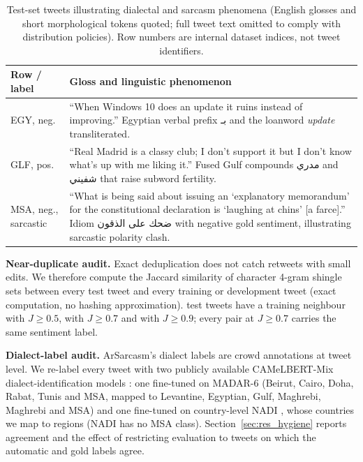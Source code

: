 \documentclass[11pt]{article}
\newcommand{\textarabic}[1]{{\beginR\arabicfont #1\endR}}
\begin{document}
\begin{table}[tbp]
\caption{Test-set tweets illustrating dialectal and sarcasm phenomena (English glosses and short morphological tokens quoted; full tweet text omitted to comply with distribution policies). Row numbers are internal dataset indices, not tweet identifiers.}
\label{tab:examples}
\centering
\footnotesize
\setlength{\tabcolsep}{4pt}
\begin{tabularx}{\linewidth}{>{\raggedright\arraybackslash}p{2.6cm}>{\raggedright\arraybackslash}X}
\toprule
\textbf{Row / label} & \textbf{Gloss and linguistic phenomenon} \\
\midrule
4199 EGY, neg. & ``When Windows 10 does an update it ruins instead of improving.'' Egyptian verbal prefix \textarabic{بـ} and the loanword \emph{update} transliterated. \\
\addlinespace
4205 GLF, pos. & ``Real Madrid is a classy club; I don't support it but I don't know what's up with me liking it.'' Fused Gulf compounds \textarabic{مدري} and \textarabic{شفيني} that raise subword fertility. \\
\addlinespace
4196 MSA, neg., sarcastic & ``What is being said about issuing an `explanatory memorandum' for the constitutional declaration is `laughing at chins' [a farce].'' Idiom \textarabic{ضحك على الذقون} with negative gold sentiment, illustrating sarcastic polarity clash. \\
\bottomrule
\end{tabularx}
\end{table}

\textbf{Near-duplicate audit.} Exact deduplication does not catch retweets with small edits. We therefore compute the Jaccard similarity of character 4-gram shingle sets \cite{broder1997minhash} between every test tweet and every training or development tweet (exact computation, no hashing approximation). \ndFive{} test tweets have a training neighbour with $J\ge0.5$, \ndSeven{} with $J\ge0.7$ and \ndNine{} with $J\ge0.9$; every pair at $J\ge0.7$ carries the same sentiment label.

\textbf{Dialect-label audit.} ArSarcasm's dialect labels are crowd annotations at tweet level. We re-label every tweet with two publicly available CAMeLBERT-Mix dialect-identification models \cite{inoue2021interplay}: one fine-tuned on MADAR-6 \cite{bouamor2018madar} (Beirut, Cairo, Doha, Rabat, Tunis and MSA, mapped to Levantine, Egyptian, Gulf, Maghrebi, Maghrebi and MSA) and one fine-tuned on country-level NADI \cite{abdulmageed2020nadi}, whose countries we map to regions (NADI has no MSA class). Section~\ref{sec:res_hygiene} reports agreement and the effect of restricting evaluation to tweets on which the automatic and gold labels agree.
\end{document}
